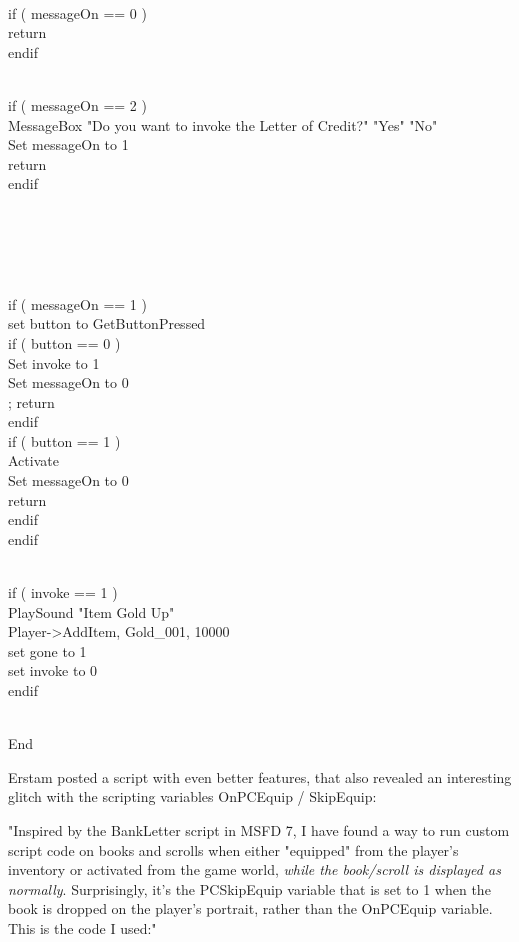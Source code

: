 \documentclass[
]{article}
\begin{document}
\strut \\
if ( messageOn == 0 )\\
return\\
endif\\
\strut \\
if ( messageOn == 2 )\\
MessageBox "Do you want to invoke the Letter of Credit?" "Yes" "No"\\
Set messageOn to 1\\
return\\
endif\\
\strut \\
\strut \\
\strut \\
if ( messageOn == 1 )\\
set button to GetButtonPressed\\
if ( button == 0 )\\
Set invoke to 1\\
Set messageOn to 0\\
; return\\
endif\\
if ( button == 1 )\\
Activate\\
Set messageOn to 0\\
return\\
endif\\
endif\\
\strut \\
if ( invoke == 1 )\\
PlaySound "Item Gold Up"\\
Player-\textgreater AddItem, Gold\_001, 10000\\
set gone to 1\\
set invoke to 0\\
endif\\
\strut \\
End

Erstam posted a script with even better features, that also revealed an
interesting glitch with the scripting variables OnPCEquip / SkipEquip:

"Inspired by the BankLetter script in MSFD 7, I have found a way to run
custom script code on books and scrolls when either "equipped" from the
player's inventory or activated from the game world, \emph{while the
book/scroll is displayed as normally}. Surprisingly, it's the
PCSkipEquip variable that is set to 1 when the book is dropped on the
player's portrait, rather than the OnPCEquip variable. This is the code
I used:"
\end{document}
